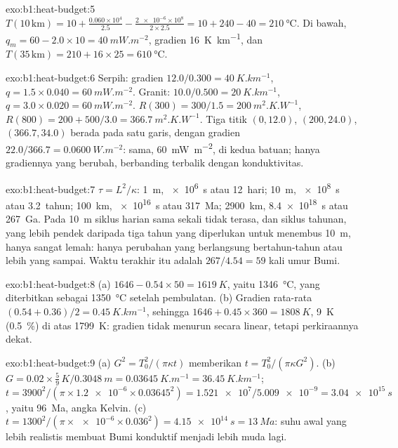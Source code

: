 \begin{solution}{exo:b1:heat-budget:5}
$T(10\,\text{km}) = 10 + \frac{0.060\times10^4}{2.5} - \frac{\num{2e-6}\times10^8}{2\times2.5}
= 10 + 240 - 40 = \qty{210}{\degreeCelsius}$. Di bawah, $q_m = 60 - 2.0\times10 =
\qty{40}{mW.m^{-2}}$, gradien \qty{16}{K.km^{-1}}, dan
$T(35\,\text{km}) = 210 + 16\times25 = \qty{610}{\degreeCelsius}$.
\end{solution}

\begin{solution}{exo:b1:heat-budget:6}
Serpih: gradien $12.0/0.300 = \qty{40}{K.km^{-1}}$, $q = 1.5\times0.040 =
\qty{60}{mW.m^{-2}}$. Granit: $10.0/0.500 = \qty{20}{K.km^{-1}}$,
$q = 3.0\times0.020 = \qty{60}{mW.m^{-2}}$. $R(300) = 300/1.5 =
\qty{200}{m^2.K.W^{-1}}$, $R(800) = 200 + 500/3.0 = \qty{366.7}{m^2.K.W^{-1}}$.
Tiga titik $(0, 12.0)$, $(200, 24.0)$, $(366.7, 34.0)$ berada pada satu garis, dengan
gradien $22.0/366.7 = \qty{0.0600}{W.m^{-2}}$:  sama,
\qty{60}{mW.m^{-2}}, di kedua batuan; hanya gradiennya yang berubah, berbanding terbalik
dengan konduktivitas.
\end{solution}

\begin{solution}{exo:b1:heat-budget:7}
$\tau = L^2/\kappa$: \qty{1}{m}, \qty{e6}{s} atau \num{12}~hari; \qty{10}{m},
\qty{e8}{s} atau \num{3.2}~tahun; \qty{100}{km}, \qty{e16}{s} atau
\qty{317}{Ma}; \qty{2900}{km}, \qty{8.4e18}{s} atau \qty{267}{Ga}. Pada
\qty{10}{m} siklus harian sama sekali tidak terasa, dan siklus tahunan, yang lebih pendek
daripada tiga tahun yang diperlukan untuk menembus \qty{10}{m}, hanya sangat lemah: hanya perubahan
yang berlangsung bertahun-tahun atau lebih yang sampai. Waktu terakhir itu adalah $267/4.54 = 59$ kali umur
Bumi.
\end{solution}

\begin{solution}{exo:b1:heat-budget:8}
(a) $1646 - 0.54\times50 = \qty{1619}{K}$, yaitu \qty{1346}{\degreeCelsius},
yang diterbitkan sebagai \qty{1350}{\degreeCelsius} setelah pembulatan. (b) Gradien rata-rata
$(0.54 + 0.36)/2 = \qty{0.45}{K.km^{-1}}$, sehingga $1646 + 0.45\times360 =
\qty{1808}{K}$, \qty{9}{K} (\qty{0.5}{\percent}) di atas \qty{1799}{K}: gradien
tidak menurun secara linear, tetapi perkiraannya dekat.
\end{solution}

\begin{solution}{exo:b1:heat-budget:9}
(a) $G^2 = T_0^2/(\pi\kappa t)$ memberikan $t = T_0^2/(\pi\kappa G^2)$.
(b) $G = 0.02\times\tfrac59\,\unit{K}/\qty{0.3048}{m} = \qty{0.03645}{K.m^{-1}} =
\qty{36.45}{K.km^{-1}}$; $t = 3900^2/(\pi\times\num{1.2e-6}\times0.03645^2) =
\num{1.521e7}/\num{5.009e-9} = \qty{3.04e15}{s}$, yaitu \qty{96}{Ma},
angka Kelvin. (c) $t = 1300^2/(\pi\times\num{e-6}\times0.036^2) =
\qty{4.15e14}{s} = \qty{13}{Ma}$: suhu awal yang lebih realistis membuat
Bumi konduktif menjadi lebih muda lagi.
\end{solution}

